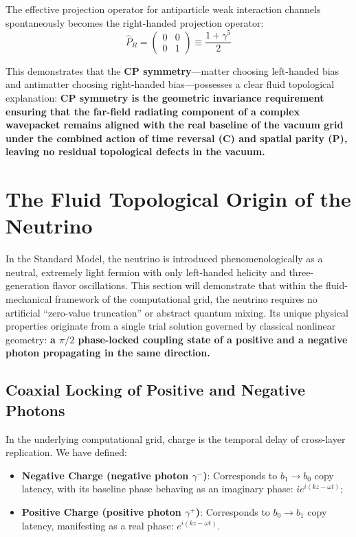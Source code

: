 \documentclass[12pt, a4paper]{article}
\begin{document}
The effective projection operator for antiparticle weak interaction channels spontaneously becomes the right-handed projection operator:
\begin{equation}
\hat{P}_R = \begin{pmatrix} 0 & 0 \\ 0 & 1 \end{pmatrix} \equiv \frac{1 + \gamma^5}{2} \label{eq:right_projection}
\end{equation}

This demonstrates that the \textbf{CP symmetry}—matter choosing left-handed bias and antimatter choosing right-handed bias—possesses a clear fluid topological explanation: \textbf{CP symmetry is the geometric invariance requirement ensuring that the far-field radiating component of a complex wavepacket remains aligned with the real baseline of the vacuum grid under the combined action of time reversal (C) and spatial parity (P), leaving no residual topological defects in the vacuum.}

\section{The Fluid Topological Origin of the Neutrino}

In the Standard Model, the neutrino is introduced phenomenologically as a neutral, extremely light fermion with only left-handed helicity and three-generation flavor oscillations. This section will demonstrate that within the fluid-mechanical framework of the computational grid, the neutrino requires no artificial ``zero-value truncation'' or abstract quantum mixing. Its unique physical properties originate from a single trial solution governed by classical nonlinear geometry: \textbf{a $\pi/2$ phase-locked coupling state of a positive and a negative photon propagating in the same direction.}

\subsection{Coaxial Locking of Positive and Negative Photons}

In the underlying computational grid, charge is the temporal delay of cross-layer replication. We have defined:
\begin{itemize}
    \item \textbf{Negative Charge (negative photon $\gamma^-$)}: Corresponds to $b_1 \to b_0$ copy latency, with its baseline phase behaving as an imaginary phase: $i e^{i(kz-\omega t)}$;
    
    \item \textbf{Positive Charge (positive photon $\gamma^+$)}: Corresponds to $b_0 \to b_1$ copy latency, manifesting as a real phase: $e^{i(kz-\omega t)}$.
\end{itemize}
\end{document}
